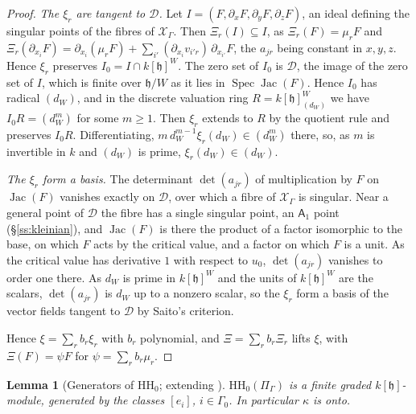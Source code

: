 \documentclass[11pt]{amsart}
\numberwithin{table}{section}
\numberwithin{figure}{section}
\numberwithin{equation}{section}
\newtheorem{lem}[thm]{Lemma}
\theoremstyle{definition}
\theoremstyle{plain}
\newcommand{\cX}{\mathcal{X}}
\newcommand{\h}{\mathfrak{h}}
\newcommand{\HH}{\mathrm{HH}}
\DeclareMathOperator{\Spec}{Spec}
\DeclareMathOperator{\Jac}{Jac}
\begin{document}
\begin{proof}
\emph{The $\xi_r$ are tangent to $\mathcal D$.} Let $I = (F, \partial_xF, \partial_yF, \partial_zF)$, an ideal defining the singular points of the fibres of $\cX_\Gamma$. Then $\Xi_r(I) \subseteq I$, as $\Xi_r(F) = \mu_rF$ and $\Xi_r(\partial_{x_i}F) = \partial_{x_i}(\mu_rF) + \sum_{i'} (\partial_{x_i}v_{i'r})\,\partial_{x_{i'}}F$, the $a_{jr}$ being constant in $x, y, z$. Hence $\xi_r$ preserves $I_0 = I \cap k[\h]^W$. The zero set of $I_0$ is $\mathcal D$, the image of the zero set of $I$, which is finite over $\h/W$ as it lies in $\Spec\Jac(F)$. Hence $I_0$ has radical $(d_W)$, and in the discrete valuation ring $R = k[\h]^W_{(d_W)}$ we have $I_0R = (d_W^m)$ for some $m \ge 1$. Then $\xi_r$ extends to $R$ by the quotient rule and preserves $I_0R$. Differentiating, $m\,d_W^{m-1}\xi_r(d_W) \in (d_W^m)$ there, so, as $m$ is invertible in $k$ and $(d_W)$ is prime, $\xi_r(d_W) \in (d_W)$.

\emph{The $\xi_r$ form a basis.} The determinant $\det(a_{jr})$ of multiplication by $F$ on $\Jac(F)$ vanishes exactly on $\mathcal D$, over which a fibre of $\cX_\Gamma$ is singular. Near a general point of $\mathcal D$ the fibre has a single singular point, an $\mathsf{A}_1$ point (\S\ref{ss:kleinian}), and $\Jac(F)$ is there the product of a factor isomorphic to the base, on which $F$ acts by the critical value, and a factor on which $F$ is a unit. As the critical value has derivative $1$ with respect to $u_0$, $\det(a_{jr})$ vanishes to order one there. As $d_W$ is prime in $k[\h]^W$ and the units of $k[\h]^W$ are the scalars, $\det(a_{jr})$ is $d_W$ up to a nonzero scalar, so the $\xi_r$ form a basis of the vector fields tangent to $\mathcal D$ by Saito's criterion.

Hence $\xi = \sum_r b_r\xi_r$ with $b_r$ polynomial, and $\Xi = \sum_r b_r\Xi_r$ lifts $\xi$, with $\Xi(F) = \psi F$ for $\psi = \sum_r b_r\mu_r$.
\end{proof}

\begin{lem}[{Generators of $\HH_0$; extending \cite[Thm~1.4(a)]{MOV}}]\label{lem:HHgen}
$\HH_0(\Pi_\Gamma)$ is a finite graded $k[\h]$-module, generated by the classes $[e_i]$, $i \in \Gamma_0$. In particular $\kappa$ is onto.
\end{lem}
\end{document}
